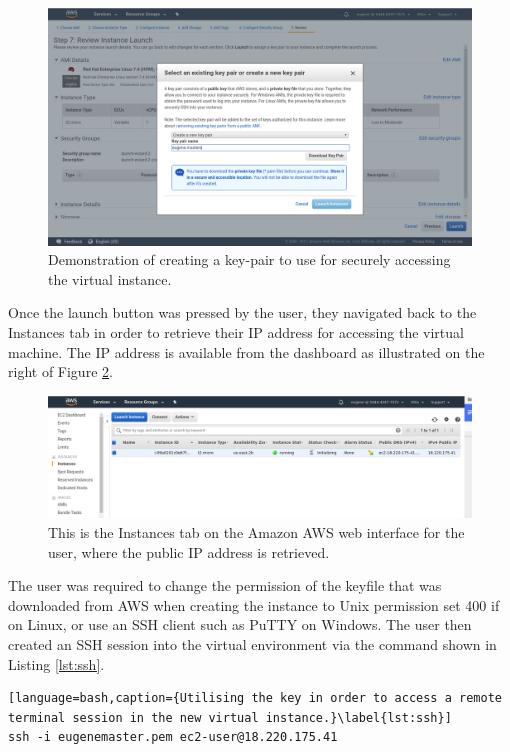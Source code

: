 \begin{figure}[h!]
\centering
\includegraphics[width=\textwidth]{Figures/4_aws_keypair.png}
\decoRule
\caption[AWS Keypair Creation]{Demonstration of creating a key-pair to use for securely accessing the virtual instance.}
\label{fig:aws_keypair}
\end{figure}

Once the launch button was pressed by the user, they navigated back to the Instances tab in order to retrieve their IP address for accessing the virtual machine. The IP address is available from the dashboard as illustrated on the right of Figure \ref{fig:aws_instancelist}. 

\begin{figure}[h!]
\centering
\includegraphics[width=\textwidth]{Figures/4_aws_instancelist.png}
\decoRule
\caption[AWS Instances View]{This is the Instances tab on the Amazon AWS web interface for the user, where the public IP address is retrieved.}
\label{fig:aws_instancelist}
\end{figure}

The user was required to change the permission of the keyfile that was downloaded from AWS when creating the instance to Unix permission set 400 if on Linux, or use an SSH client such as PuTTY on Windows. The user then created an SSH session into the virtual environment via the command shown in Listing \ref{lst:ssh}.

\begin{lstlisting}[language=bash,caption={Utilising the key in order to access a remote terminal session in the new virtual instance.}\label{lst:ssh}]
ssh -i eugenemaster.pem ec2-user@18.220.175.41
\end{lstlisting}

